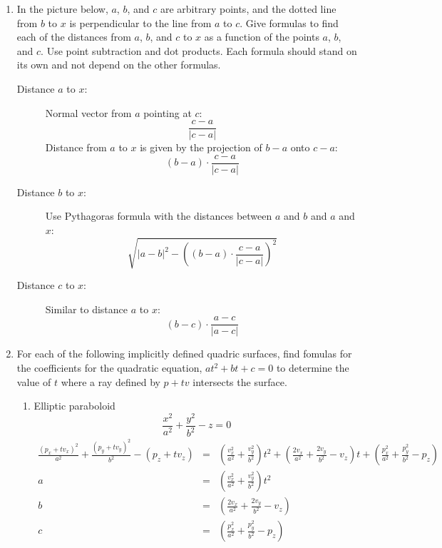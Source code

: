 \documentclass{article}
\begin{document}

\begin{enumerate}

\item
  In the picture below, $a$, $b$, and $c$ are arbitrary points, and
  the dotted line from $b$ to $x$ is perpendicular to the line from
  $a$ to $c$.  Give formulas to find each of the
  distances from 
  $a$, $b$, and $c$ to $x$ as a function of the points $a$, $b$, and $c$.
  Use point subtraction and dot products.  Each formula should stand
  on its own and not depend on the other formulas.

\newcommand{\mypoint}[3] {
  \node (#1) at (#2) {};
  \fill (#2) circle (2pt);
  \node[anchor=#3] (label#1) at (#2) {$#1$};
  }

\begin{description}
\item[Distance $a$ to $x$:]
  Normal vector from $a$ pointing at $c$:
  \[ \frac{c-a}{|c-a|} \]
  Distance from $a$ to $x$ is given by the projection of $b-a$
  onto $c-a$: \[ (b-a) \cdot \frac{c-a}{|c-a|} \]

\item[Distance $b$ to $x$:] Use Pythagoras formula with the distances
  between $a$ and $b$ and $a$ and $x$:
  \[
  \sqrt{|a-b|^2 - \left((b-a) \cdot \frac{c-a}{|c-a|} \right)^2}
  \]

  

\item[Distance $c$ to $x$:]
  Similar to distance $a$ to $x$:
  \[ (b-c) \cdot \frac{a-c}{|a-c|} \]
 
  
\end{description}



\item For each of the following implicitly defined quadric surfaces,
  find fomulas for  the coefficients  for the quadratic equation,
  $at^2 + bt + c = 0$
  to determine the value of $t$ where a ray defined by $p + tv$
  intersects the surface. 
  \begin{enumerate}
  \item Elliptic paraboloid \[\frac{x^2}{a^2} + \frac{y^2}{b^2} - z =
    0\]
\begin{eqnarray*}
\frac{(p_x +tv_x)^2}{a^2} +\frac{(p_y +tv_y)^2}{b^2} - (p_z +tv_z)
&=&
\left(\frac{v_x^2}{a^2} + \frac{v_y^2}{b^2}\right)t^2
+
\left(\frac{2v_x}{a^2} + \frac{2v_y}{b^2} - v_z\right)t
+
\left(\frac{p_x^2}{a^2} + \frac{p_y^2}{b^2} - {p_z}\right)
\\
a&=&\left(\frac{v_x^2}{a^2} + \frac{v_y^2}{b^2}\right)t^2\\
b&=&\left(\frac{2v_x}{a^2} + \frac{2v_y}{b^2} - v_z\right)\\
c&=&\left(\frac{p_x^2}{a^2} + \frac{p_y^2}{b^2} - {p_z}\right)
\end{eqnarray*}


\end{enumerate}
\end{enumerate}
\end{document}
